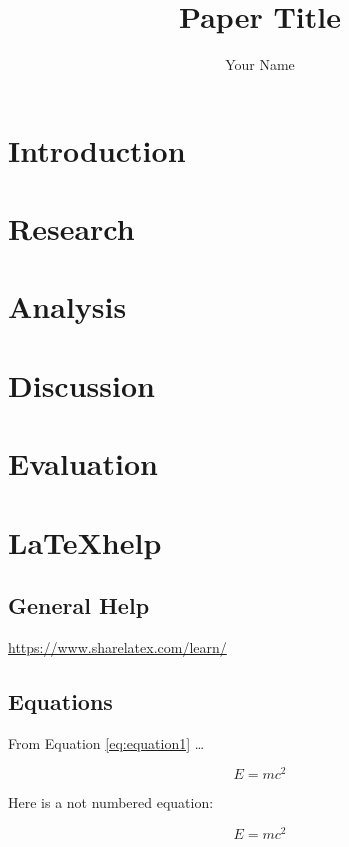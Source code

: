 \documentclass[11pt,a4paper,titlepage]{article}
\title{Paper Title}
\author{Your Name}
\begin{document}
\maketitle


\clearpage

\tableofcontents

\clearpage


\section{Introduction}
\section{Research}
\section{Analysis}
\section{Discussion}
\section{Evaluation}

\section{\LaTeX help}

\subsection{General Help}

\url{https://www.sharelatex.com/learn/}


\subsection{Equations}

From Equation \eqref{eq:equation1} \ldots

\begin{equation}
\label{eq:equation1}
E = m c^2
\end{equation}

Here is a not numbered equation:

\begin{equation*}
\label{eq:equation1}
E = m c^2
\end{equation*}
\end{document}
